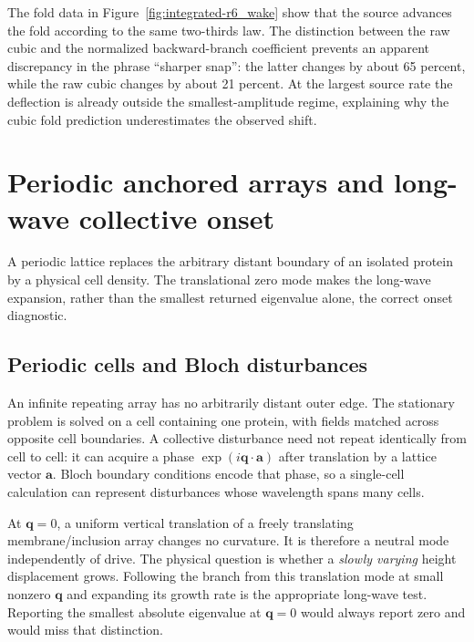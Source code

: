 

The fold data in Figure~\ref{fig:integrated-r6_wake} show that the source advances the fold according to the same two-thirds law. The distinction between the raw cubic and the normalized backward-branch coefficient prevents an apparent discrepancy in the phrase ``sharper snap'': the latter changes by about 65 percent, while the raw cubic changes by about 21 percent. At the largest source rate the deflection is already outside the smallest-amplitude regime, explaining why the cubic fold prediction underestimates the observed shift.


\section{Periodic anchored arrays and long-wave collective onset}\label{sec:lattice}
A periodic lattice replaces the arbitrary distant boundary of an isolated protein by a physical cell density. The translational zero mode makes the long-wave expansion, rather than the smallest returned eigenvalue alone, the correct onset diagnostic.


\subsection{Periodic cells and Bloch disturbances}
An infinite repeating array has no arbitrarily distant outer edge. The stationary problem is solved on a cell containing one protein, with fields matched across opposite cell boundaries. A collective disturbance need not repeat identically from cell to cell: it can acquire a phase $\exp(i\bm q\cdot\bm a)$ after translation by a lattice vector $\bm a$. Bloch boundary conditions encode that phase, so a single-cell calculation can represent disturbances whose wavelength spans many cells.

At $\bm q=0$, a uniform vertical translation of a freely translating membrane/inclusion array changes no curvature. It is therefore a neutral mode independently of drive. The physical question is whether a \emph{slowly varying} height displacement grows. Following the branch from this translation mode at small nonzero $\bm q$ and expanding its growth rate is the appropriate long-wave test. Reporting the smallest absolute eigenvalue at $\bm q=0$ would always report zero and would miss that distinction.


